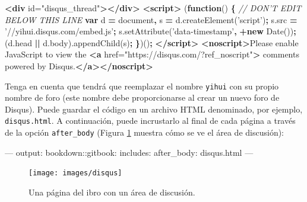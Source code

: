 \documentclass[12pt,]{krantz}
\makeatletter
\newenvironment{Shaded}{\begin{snugshade}}{\end{snugshade}}
\newcommand{\KeywordTok}[1]{\textcolor[rgb]{0.13,0.29,0.53}{\textbf{#1}}}
\newcommand{\StringTok}[1]{\textcolor[rgb]{0.31,0.60,0.02}{#1}}
\newcommand{\CommentTok}[1]{\textcolor[rgb]{0.56,0.35,0.01}{\textit{#1}}}
\newcommand{\OtherTok}[1]{\textcolor[rgb]{0.56,0.35,0.01}{#1}}
\newcommand{\FunctionTok}[1]{\textcolor[rgb]{0.00,0.00,0.00}{#1}}
\newcommand{\VariableTok}[1]{\textcolor[rgb]{0.00,0.00,0.00}{#1}}
\newcommand{\OperatorTok}[1]{\textcolor[rgb]{0.81,0.36,0.00}{\textbf{#1}}}
\newcommand{\AttributeTok}[1]{\textcolor[rgb]{0.77,0.63,0.00}{#1}}
\newcommand{\NormalTok}[1]{#1}
\newenvironment{kframe}{%
\medskip{}
\setlength{\fboxsep}{.8em}
 \def\at@end@of@kframe{}%
 \ifinner\ifhmode%
  \def\at@end@of@kframe{\end{minipage}}%
  \begin{minipage}{\columnwidth}%
 \fi\fi%
 \def\FrameCommand##1{\hskip\@totalleftmargin \hskip-\fboxsep
 \colorbox{shadecolor}{##1}\hskip-\fboxsep
     \hskip-\linewidth \hskip-\@totalleftmargin \hskip\columnwidth}%
 \MakeFramed {\advance\hsize-\width
   \@totalleftmargin\z@ \linewidth\hsize
   \@setminipage}}%
 {\par\unskip\endMakeFramed%
 \at@end@of@kframe}
\renewenvironment{Shaded}{\begin{kframe}}{\end{kframe}}
\theoremstyle{definition}
\theoremstyle{definition}
\theoremstyle{definition}
\theoremstyle{remark}
\makeatother
\begin{document}
\begin{Shaded}
\begin{Highlighting}[]
\KeywordTok{<div}\OtherTok{ id=}\StringTok{"disqus_thread"}\KeywordTok{></div>}
\KeywordTok{<script>}
\NormalTok{(}\KeywordTok{function}\NormalTok{() }\OperatorTok{\{} \CommentTok{// DON'T EDIT BELOW THIS LINE}
\KeywordTok{var}\NormalTok{ d }\OperatorTok{=}\NormalTok{ document}\OperatorTok{,}\NormalTok{ s }\OperatorTok{=} \VariableTok{d}\NormalTok{.}\AttributeTok{createElement}\NormalTok{(}\StringTok{'script'}\NormalTok{)}\OperatorTok{;}
\VariableTok{s}\NormalTok{.}\AttributeTok{src} \OperatorTok{=} \StringTok{'//yihui.disqus.com/embed.js'}\OperatorTok{;}
\VariableTok{s}\NormalTok{.}\AttributeTok{setAttribute}\NormalTok{(}\StringTok{'data-timestamp'}\OperatorTok{,} \OperatorTok{+}\KeywordTok{new} \AttributeTok{Date}\NormalTok{())}\OperatorTok{;}
\NormalTok{(}\VariableTok{d}\NormalTok{.}\AttributeTok{head} \OperatorTok{||} \VariableTok{d}\NormalTok{.}\AttributeTok{body}\NormalTok{).}\AttributeTok{appendChild}\NormalTok{(s)}\OperatorTok{;}
\OperatorTok{\}}\NormalTok{)()}\OperatorTok{;}
\KeywordTok{</script>}
\KeywordTok{<noscript>}\NormalTok{Please enable JavaScript to view the}
\KeywordTok{<a}\OtherTok{ href=}\StringTok{"https://disqus.com/?ref_noscript"}\KeywordTok{>}
\NormalTok{  comments powered by Disqus.}\KeywordTok{</a></noscript>}
\end{Highlighting}
\end{Shaded}

Tenga en cuenta que tendrá que reemplazar el nombre \texttt{yihui} con
su propio nombre de foro (este nombre debe proporcionarse al crear un
nuevo foro de Disqus). Puede guardar el código en un archivo HTML
denominado, por ejemplo, \texttt{disqus.html}. A continuación, puede
incrustarlo al final de cada página a través de la opción
\texttt{after\_body} (Figura \ref{fig:disqus} muestra cómo se ve el área
de discusión):

\begin{Shaded}
\begin{Highlighting}[]
\OtherTok{---}
\FunctionTok{output:}
  \FunctionTok{bookdown:}\AttributeTok{:gitbook:}
    \FunctionTok{includes:}
      \FunctionTok{after_body:}\AttributeTok{ disqus.html}
\OtherTok{---}
\end{Highlighting}
\end{Shaded}

\begin{figure}
\texttt{[image: images/disqus]} \caption{Una página del ibro con un área de discusión.}\label{fig:disqus}
\end{figure}
\end{document}
